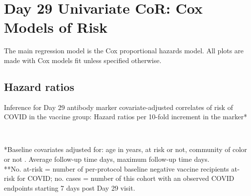 \documentclass[]{book}
\theoremstyle{definition}
\theoremstyle{definition}
\theoremstyle{definition}
\newcommand{\1}{\mathbbm{1}}
\begin{document}
\clearpage

\hypertarget{cor-coxph-Day29}{%
\chapter{Day 29 Univariate CoR: Cox Models of Risk}\label{cor-coxph-Day29}}

The main regression model is the Cox proportional hazards model. All plots are made with Cox models fit unless specified otherwise.

\hypertarget{hazard-ratios-1}{%
\section{Hazard ratios}\label{hazard-ratios-1}}

\begin{table}[H]
\caption{Inference for Day 29 antibody marker covariate-adjusted correlates of risk of COVID in the vaccine group: Hazard ratios per 10-fold increment in the marker*}
\begin{center}
    \\
\end{center}
*Baseline covariates adjusted for: age in years, at risk or not, community of color or not
. Average follow-up time  days, maximum follow-up time  days.\\
**No. at-risk = number of per-protocol baseline negative vaccine recipients at-risk for COVID; no. cases = number of this cohort with an observed COVID endpoints starting 7 days post Day 29 visit.

\end{table}
\end{document}
